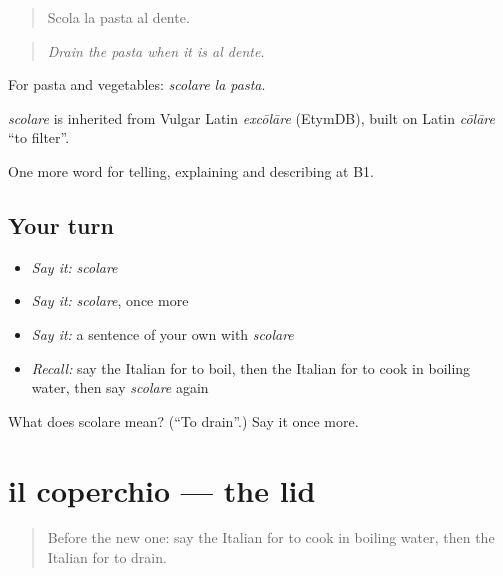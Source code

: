 \begin{quote}
Scola la pasta al dente.
\end{quote}

\begin{quote}
\emph{Drain the pasta when it is al dente.}
\end{quote}

For pasta and vegetables: \emph{scolare la pasta}.

\begin{cousinweb}
\emph{scolare} is inherited from Vulgar Latin \emph{excōlāre} (EtymDB), built on Latin \emph{cōlāre} \textquotedblleft{}to filter\textquotedblright{}.
\end{cousinweb}

\begin{grammarlens}[title={What you've built}]
One more word for telling, explaining and describing at B1.
\end{grammarlens}

\subsection*{Your turn}
\begin{itemize}
\raggedright
  \item \emph{Say it:} \emph{scolare}
  \item \emph{Say it:} \emph{scolare}, once more
  \item \emph{Say it:} a sentence of your own with \emph{scolare}
  \item \emph{Recall:} say the Italian for to boil, then the Italian for to cook in boiling water, then say \emph{scolare} again
\end{itemize}

\begin{tcolorbox}[breakable,colback=teal!4,colframe=teal!35!black,title={Before you move on}]
What does scolare mean? (\textquotedblleft{}To drain\textquotedblright{}.) Say it once more.
\end{tcolorbox}
\section[il coperchio]{il coperchio — the lid}

\label{lesson:IT-C333-coperchio}



\begin{quote}
Before the new one: say the Italian for to cook in boiling water, then the Italian for to drain.
\end{quote}

